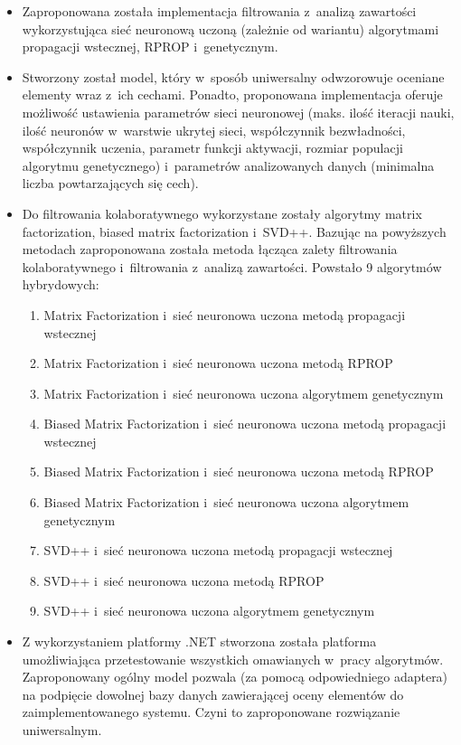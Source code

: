 \documentclass[twoside]{iisthesis}
\begin{document}
	\begin{itemize}
		\item Zaproponowana została implementacja filtrowania z~analizą zawartości wykorzystująca sieć neuronową uczoną (zależnie od wariantu) algorytmami propagacji wstecznej, RPROP i~genetycznym.
		\item Stworzony został model, który w~sposób uniwersalny odwzorowuje oceniane elementy wraz z~ich cechami. Ponadto, proponowana implementacja oferuje możliwość ustawienia parametrów sieci neuronowej (maks. ilość iteracji nauki, ilość neuronów w~warstwie ukrytej sieci, współczynnik bezwładności, współczynnik uczenia, parametr funkcji aktywacji, rozmiar populacji algorytmu genetycznego) i~parametrów analizowanych danych (minimalna liczba powtarzających się cech).
		\item Do filtrowania kolaboratywnego wykorzystane zostały algorytmy matrix factorization, biased matrix factorization i~SVD++. Bazując na powyższych metodach zaproponowana została metoda łącząca zalety filtrowania kolaboratywnego i~filtrowania z~analizą zawartości. Powstało 9 algorytmów hybrydowych: 	
		\begin{enumerate}[leftmargin=1.2cm]
			\item Matrix Factorization i~sieć neuronowa uczona metodą propagacji wstecznej
			\item Matrix Factorization i~sieć neuronowa uczona metodą RPROP
			\item Matrix Factorization i~sieć neuronowa uczona algorytmem genetycznym
			\item Biased Matrix Factorization i~sieć neuronowa uczona metodą propagacji wstecznej
			\item Biased Matrix Factorization i~sieć neuronowa uczona metodą RPROP
			\item Biased Matrix Factorization i~sieć neuronowa uczona algorytmem genetycznym
			\item SVD++ i~sieć neuronowa uczona metodą propagacji wstecznej
			\item SVD++ i~sieć neuronowa uczona metodą RPROP
			\item SVD++ i~sieć neuronowa uczona algorytmem genetycznym
		\end{enumerate}
		
		\item Z wykorzystaniem platformy .NET stworzona została platforma umożliwiająca przetestowanie wszystkich omawianych w~pracy algorytmów. Zaproponowany ogólny model pozwala (za pomocą odpowiedniego adaptera) na podpięcie dowolnej bazy danych zawierającej oceny elementów do zaimplementowanego systemu. Czyni to zaproponowane rozwiązanie uniwersalnym.
		

\end{itemize}
\end{document}

